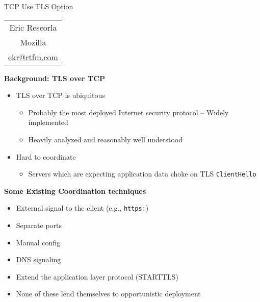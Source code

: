 \documentclass[helvetica]{seminar}
\newcommand{\heading}[1]{%
  \begin{center} 
    \large\bf 
    #1 
  \end{center} 
  \vspace{.4 in}}
\begin{document}
\begin{slide}
\begin{center}
\vspace{.5 in}
\LARGE{{\bf}TCP Use TLS Option}\\
\vspace{.2in}
\large{
\begin{tabular}{c}
Eric Rescorla\\
Mozilla\\
\url{ekr@rtfm.com}
\end{tabular}
}
\end{center}

\end{slide}

\centerslidesfalse 

\begin{slide}
\heading{Background: TLS over TCP}

\begin{itemize}
\item TLS over TCP is ubiquitous
\begin{itemize}
\item Probably the most deployed Internet security protocol – Widely implemented
\item Heavily analyzed and reasonably well understood
\end{itemize}
\item Hard to coordinate
\begin{itemize}
\item  Servers which are expecting application data choke on TLS \verb^ClientHello^
\end{itemize}
\end{itemize}

\end{slide}

\begin{slide}
\heading{Some Existing Coordination techniques}

\begin{itemize}
\item External signal to the client (e.g., \verb^https:^)
\item Separate ports
\item Manual config
\item DNS signaling
\item Extend the application layer protocol (STARTTLS)
\item None of these lend themselves to opportunistic deployment
\end{itemize}

\end{slide}
\end{document}
